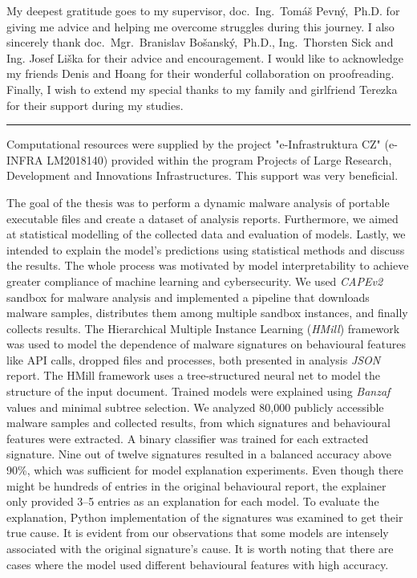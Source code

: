 \documentclass[11pt,twoside,a4paper]{book}
\begin{document}
	\translate

	{
		
		\newpage
	}

	\coverpagestarts

	\acknowledgements
	\noindent
	My deepest gratitude goes to my supervisor, doc.~Ing.~Tomáš Pevný,~Ph.D. for giving me advice and helping me overcome struggles during this journey. I also sincerely thank doc.~Mgr.~Branislav Bošanský,~Ph.D., Ing.~Thorsten Sick and Ing. Josef Liška for their advice and encouragement. I would like to acknowledge my friends Denis and Hoang for their wonderful collaboration on proofreading. Finally, I wish to extend my special thanks to my family and girlfriend Terezka for their support during my studies.

	\noindent\rule{\textwidth}{0.4pt}

	\noindent Computational resources were supplied by the project "e-Infrastruktura CZ" (e-INFRA LM2018140) provided within the program Projects of Large Research, Development and Innovations Infrastructures. This support was very beneficial.



	\abstractpage

	The goal of the thesis was to perform a dynamic malware analysis of portable executable files and create a dataset of analysis reports. Furthermore, we aimed at statistical modelling of the collected data and evaluation of models. Lastly, we intended to explain the model's predictions using statistical methods and discuss the results. The whole process was motivated by model interpretability to achieve greater compliance of machine learning and cybersecurity. We used \emph{CAPEv2} sandbox for malware analysis and implemented a pipeline that downloads malware samples, distributes them among multiple sandbox instances, and finally collects results. The Hierarchical Multiple Instance Learning (\emph{HMill}) framework was used to model the dependence of malware signatures on behavioural features like API calls, dropped files and processes, both presented in analysis \emph{JSON} report. The HMill framework uses a tree-structured neural net to model the structure of the input document. Trained models were explained using \emph{Banzaf} values and minimal subtree selection. We analyzed 80,000 publicly accessible malware samples and collected results, from which signatures and behavioural features were extracted. A binary classifier was trained for each extracted signature. Nine out of twelve signatures resulted in a balanced accuracy above 90\%, which was sufficient for model explanation experiments. Even though there might be hundreds of entries in the original behavioural report, the explainer only provided 3--5 entries as an explanation for each model. To evaluate the explanation, Python implementation of the signatures was examined to get their true cause. It is evident from our observations that some models are intensely associated with the original signature's cause. It is worth noting that there are cases where the model used different behavioural features with high accuracy. \
	
\end{document}
